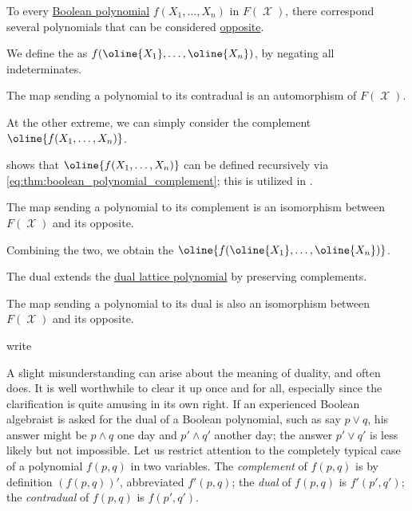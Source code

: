 \begin{definition}\label{def:dual_boolean_polynomial}
  To every \hyperref[def:free_boolean_algebra/polynomial]{Boolean polynomial} \( f(X_1, \ldots, X_n) \) in \( F(\mscrX) \), there correspond several polynomials that can be considered \hyperref[con:opposite_object]{opposite}.

  \begin{thmenum}
     We define the  as \( f(\oline{X_1}, \ldots, \oline{X_n}) \), by negating all indeterminates.

    The map sending a polynomial to its contradual is an automorphism of \( F(\mscrX) \).

     At the other extreme, we can simply consider the complement \( \oline{f(X_1, \ldots, X_n)} \).

     shows that \( \oline{f(X_1, \ldots, X_n)} \) can be defined recursively via \eqref{eq:thm:boolean_polynomial_complement}; this is utilized in .

    The map sending a polynomial to its complement is an isomorphism between \( F(\mscrX) \) and its opposite.

     Combining the two, we obtain the  \( \oline{f(\oline{X_1}, \ldots, \oline{X_n})} \).

    The dual extends the \hyperref[def:dual_lattice_polynomial]{dual lattice polynomial} by preserving complements.

    The map sending a polynomial to its dual is also an isomorphism between \( F(\mscrX) \) and its opposite.
  \end{thmenum}
\end{definition}
\begin{comments}
  \item \Textcite*[ch. 4]{HalmosGivant2009BooleanAlgebras} write
  \begin{displayquote}
    A slight misunderstanding can arise about the meaning of duality, and often does. It is well worthwhile to clear it up once and for all, especially since the clarification is quite amusing in its own right. If an experienced Boolean algebraist is asked for the dual of a Boolean polynomial, such as say \( p \vee q \), his answer might be \( p \wedge q \) one day and \( p' \wedge q' \) another day; the answer \( p' \vee q' \) is less likely but not impossible. Let us restrict attention to the completely typical case of a polynomial \( f(p, q) \) in two variables. The \textit{complement} of \( f(p, q) \) is by definition \( (f(p, q))' \), abbreviated \( f'(p, q) \); the \textit{dual} of \( f(p, q) \) is \( f'(p', q') \); the \textit{contradual} of \( f(p, q) \) is \( f(p', q') \).
  \end{displayquote}
\end{comments}

